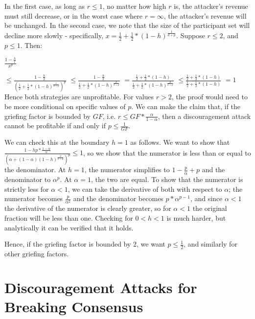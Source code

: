\documentclass[12pt]{article}
\begin{document}
In the first case, as long as $r \le 1$, no matter how high $r$ is, the attacker's revenue must still decrease, or in the worst case where $r = \infty$, the attacker's revenue will be unchanged. In the second case, we note that the size of the participant set will decline more slowly - specifically, $x = \frac{1}{2} + \frac{1}{2} * (1-h)^{\frac{1}{d+p}}$. Suppose $r \le 2$, and $p \le 1$. Then:

$\frac{1-\frac{h}{r}}{x^p}$


$ \le \frac{1-\frac{h}{2}}{(\frac{1}{2} + \frac{1}{2} * (1-h)^{\frac{1}{d+p}})^p}$
$ \le \frac{1-\frac{h}{2}}{\frac{1}{2} + \frac{1}{2} * (1-h)^{\frac{p}{d+p}}}$
$ = \frac{\frac{1}{2} + \frac{1}{2} * (1-h)}{\frac{1}{2} + \frac{1}{2} * (1-h)^{\frac{p}{d+p}}}$
$ \le \frac{\frac{1}{2} + \frac{1}{2} * (1-h)}{\frac{1}{2} + \frac{1}{2} * (1-h)}$
$ = 1$
Hence both strategies are unprofitable. For values $r > 2$, the proof would need to be more conditional on specific values of $p$. We can make the claim that, if the griefing factor is bounded by $GF$, i.e. $r \le GF * \frac{\alpha}{1-\alpha}$, then a discouragement attack cannot be profitable if and only if $p \le \frac{1}{GF}$.

We can check this at the boundary $h = 1$ as follows. We want to show that $\frac{1 - hp * \frac{1-\alpha}{\alpha}}{(\alpha + (1-\alpha)(1-h)^{\frac{d}{d+p}})^p} \le 1$, so we show that the numerator is less than or equal to the denominator. At $h = 1$, the numerator simplifies to $1 - \frac{p}{\alpha} + p$ and the denominator to $\alpha^p$. At $\alpha=1$, the two are equal. To show that the numerator is strictly less for $\alpha<1$, we can take the derivative of both with respect to $\alpha$; the numerator becomes $\frac{p}{\alpha^2}$ and the denominator becomes $p * \alpha^{p-1}$, and since $\alpha < 1$ the derivative of the numerator is clearly greater, so for $\alpha < 1$ the original fraction will be less than one. Checking for $0 < h < 1$ is much harder, but analytically it can be verified that it holds.

Hence, if the griefing factor is bounded by 2, we want $p \le \frac{1}{2}$, and similarly for other griefing factors.


\section{Discouragement Attacks for Breaking Consensus}
\end{document}
